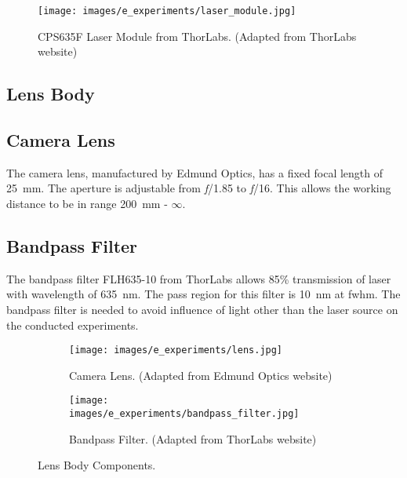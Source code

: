     \begin{figure}[ht]
        \centering
        \texttt{[image: images/e\_experiments/laser\_module.jpg]}
        \caption{CPS635F Laser Module from ThorLabs. (Adapted from ThorLabs website\cite{thorlabs_laser})}
        \label{fig:laser_module.jpg}
    \end{figure}

\subsection{Lens Body}
    \subsection*{Camera Lens}
        The camera lens, manufactured by Edmund Optics, has a fixed focal length of \SI{25}{\milli\meter}. The aperture is adjustable from \emph{f}/1.85 to \emph{f}/16. This allows the working distance to be in range \SI{200}{\milli\meter} - $\infty$.

    \subsection*{Bandpass Filter}
        The bandpass filter FLH635-10 from ThorLabs allows 85\% transmission of laser with wavelength of \SI{635}{\nano\meter}. The pass region for this filter is \SI{10}{\nano\meter} at \gls{fwhm}. The bandpass filter is needed to avoid influence of light other than the laser source on the conducted experiments.

        \begin{figure}[ht]
            \begin{subfigure}{0.5\textwidth}
                \centering
                \texttt{[image: images/e\_experiments/lens.jpg]}
                \caption{Camera Lens. (Adapted from Edmund Optics website\cite{edmund_optics_lens})}
                \label{fig:lens.jpg}
            \end{subfigure}
            \begin{subfigure}{0.5\textwidth}
                \centering
                \texttt{[image: images/e\_experiments/bandpass\_filter.jpg]}
                \caption{Bandpass Filter. (Adapted from ThorLabs website\cite{thorlabs_bandpass_filter})}
                \label{fig:bandpass_filter.jpg}
            \end{subfigure}
            \caption{Lens Body Components.}
            \label{fig:lens_body.jpg}
        \end{figure}

